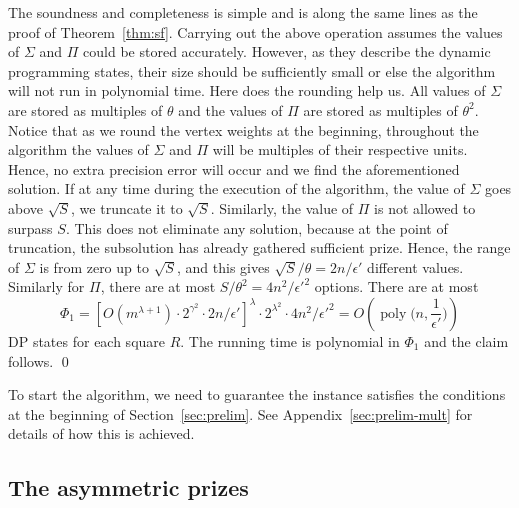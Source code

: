 \documentclass[extras,11pt]{article} \usepackage{fullpage}
\theoremstyle{mytheorem}
\newenvironment{proofof}[1]{\par\noindent{\bf #1.}\hspace{0.5em}}
    {\hfill\qed\vspace{1ex}}
\DeclareMathOperator{\poly}{poly}
\newcommand{\eps}{\epsilon}
\begin{document}
\begin{proofof}{\proofname\ of Theorem~\ref{thm:smpcsf}}
The soundness and completeness is simple and is along the same lines as the proof of Theorem~\ref{thm:sf}.
Carrying out the above operation assumes the values of $\Sigma$ and $\Pi$ could be stored
accurately.  However, as they describe the dynamic programming states, their size should be
sufficiently small or else the algorithm will not run in polynomial time.
Here does the rounding help us.
All values of $\Sigma$ are stored as multiples of $\theta$ and the values of $\Pi$ are stored
as multiples of $\theta^2$.  Notice that as we round the vertex weights at the beginning,
throughout the algorithm the values of $\Sigma$ and $\Pi$ will be multiples of their respective
units.  Hence, no extra precision error will occur and we find the aforementioned solution.
If at any time during the execution of the algorithm, the value of $\Sigma$ goes above $\sqrt S$,
we truncate it to $\sqrt S$.  Similarly, the value of $\Pi$ is not allowed to surpass $S$.
This does not eliminate any solution, because at the point of truncation, the subsolution has
already gathered sufficient prize.
Hence, the range of $\Sigma$ is from zero up to $\sqrt S$, and this gives
$\sqrt S/\theta = 2n/\eps'$ different values.
Similarly for $\Pi$, there are at most $S/\theta^2 = 4n^2/\eps'^2$ options.
There are at most
\[  \Phi_1 = \left[ O\left(m^{\lambda+1}\right) \cdot 2^{\gamma^2} \cdot 2n/\eps' \right]^{\lambda} \cdot 2^{\lambda^2} \cdot 4n^2/\eps'^2 = O\left(\poly\Big(n,\frac{1}{\eps'}\Big)\right) \]
\noindent DP states for each square $R$.
The running time is polynomial in $\Phi_1$ and the claim follows.
\end{proofof}

To start the algorithm, we need to guarantee the instance satisfies
the conditions at the beginning of Section~\ref{sec:prelim}.
See Appendix~\ref{sec:prelim-mult} for details of how this is achieved.



\subsection{The asymmetric prizes}
\end{document}
